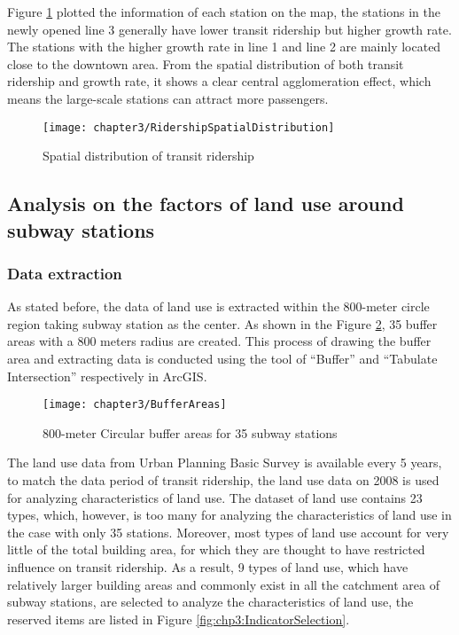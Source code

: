 %
Figure \ref{fig:chp3:RidershipSpatialDistribution} plotted the information of each station on the map, the stations in the newly opened line 3 generally have lower transit ridership but higher growth rate. The stations with the higher growth rate in line 1 and line 2 are mainly located close to the downtown area. From the spatial distribution of both transit ridership and growth rate, it shows a clear central agglomeration effect, which means the large-scale stations can attract more passengers.

%
\begin{figure}[htbp]
	\centering
	\texttt{[image: chapter3/RidershipSpatialDistribution]}
	\caption{Spatial distribution of transit ridership}
	\label{fig:chp3:RidershipSpatialDistribution}
\end{figure}

%
\subsection{Analysis on the factors of land use around subway stations}
%
\subsubsection{Data extraction}
%
As stated before, the data of land use is extracted within the 800-meter circle region taking subway station as the center. As shown in the Figure \ref{fig:chp3:BufferAreas}, 35 buffer areas with a 800 meters radius are created. This process of drawing the buffer area and extracting data is conducted using the tool of “Buffer” and “Tabulate Intersection” respectively in ArcGIS.

%
\begin{figure}[htbp]
	\centering
	\texttt{[image: chapter3/BufferAreas]}
	\caption{800-meter Circular buffer areas for 35 subway stations}
	\label{fig:chp3:BufferAreas}
\end{figure}

%
The land use data from Urban Planning Basic Survey is available every 5 years, to match the data period of transit ridership, the land use data on 2008 is used for analyzing characteristics of land use. The dataset of land use contains 23 types, which, however, is too many for analyzing the characteristics of land use in the case with only 35 stations. Moreover, most types of land use account for very little of the total building area, for which they are thought to have restricted influence on transit ridership. As a result, 9 types of land use, which have relatively larger building areas and commonly exist in all the catchment area of subway stations, are selected to analyze the characteristics of land use, the reserved items are listed in Figure \ref{fig:chp3:IndicatorSelection}.

